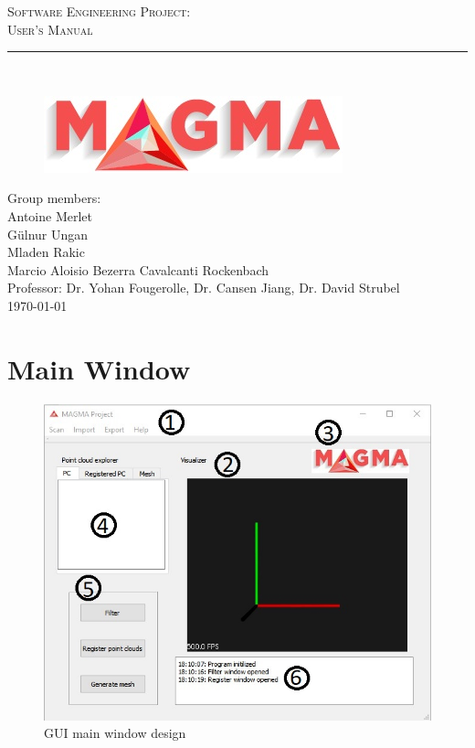 \documentclass[aps,letterpaper,11pt]{revtex4}
\newcommand{\labno}{Software Engineering Project}
\newcommand{\labtitle}{User's Manual}
\newcommand{\authorname}{Group members:\\Antoine Merlet\\Gülnur Ungan\\Mladen Rakic\\Marcio Aloisio Bezerra Cavalcanti Rockenbach}
\newcommand{\professor}{Dr. Yohan Fougerolle, Dr. Cansen Jiang, Dr. David Strubel}
\begin{document}
  
\begin{titlepage}
\begin{center}
{\LARGE \textsc{\labno:} \\ \vspace{4pt}}
{\Large \textsc{\labtitle} \\ \vspace{4pt}} 
\rule[13pt]{\textwidth}{1pt} \\ \vspace{150pt}
\begin{figure}[!htb]
  \includegraphics[scale=1.0]{logo.jpg}
\end{figure}
{\large  \authorname \\ \vspace{10pt}
Professor: \professor \\ \vspace{10pt}
\today}
\end{center}




\end{titlepage}%
\newpage

\section{Main Window}

\begin{figure}[H]
	\centering
	\includegraphics[width=15cm]{Gui_main_1.jpg}
	\caption{GUI main window design}
	\label{fig: GlobalDesignNumbers}    
\end{figure}
\end{document}
